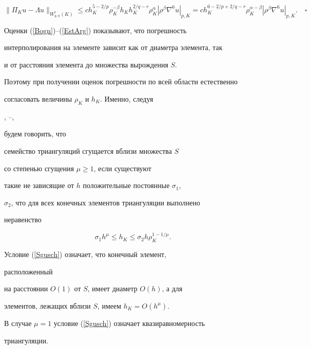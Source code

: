 $$


\| {\Pi_K u-\Lambda u} \|_{W_{q,\alpha }^r( K )}\le 


ch_K^{5-2/p}\rho _K^{-\beta }h_Kh_K^{2/q-r}\rho _K^\alpha |


 {\rho ^\beta \nabla ^6u} |_{p,K}=


ch_K^{6-2/p+2/q-r}


\rho _K^{\alpha -\beta }| {\rho ^\beta \nabla ^6u} |_{p,K}.\quad\square


$$





Оценки (\ref{Bogn})--(\ref{EstArg}) показывают, что погрешность


интерполирования на элементе зависит как от диаметра элемента, так


и от расстояния элемента до множества вырождения $S$. 


Поэтому при получении оценок погрешности по всей области естественно


согласовать величины $\rho _K $ и $h_K$. Именно, следуя 


\cite{Timer92}, \cite{Ljash93}--\cite{Timer94},


будем говорить, что 


семейство триангуляций сгущается вблизи множества $S$ 


со степенью сгущения $\mu \ge 1$, если существуют 


такие не зависящие от $h$ положительные постоянные $\sigma _1$, 


$\sigma _2$, что для всех конечных элементов триангуляции выполнено


неравенство


\begin{equation} \label{Sgusch} 


\sigma _1h^\mu \le h_K\le \sigma _2h\rho _K^{1-1/\mu }.


\end{equation}


Условие (\ref{Sgusch}) означает, что конечный элемент,


 расположенный


на расстоянии $O(1)$ от $S$, имеет диаметр $O(h)$, а для 


элементов, лежащих вблизи $S$, имеем $h_K=O(h^\mu)$.


 В случае $\mu=1$ условие (\ref{Sgusch}) означает квазиравномерность


триангуляции. 





